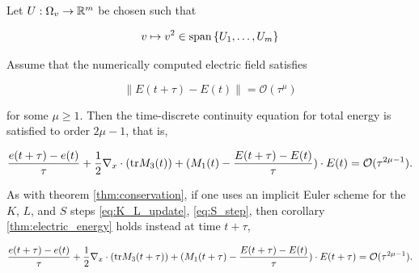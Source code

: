 \begin{corollary}\label{thm:electric_energy}
    Let $U : \Omega_v \to \mathbb{R}^m$ be chosen such that 

    \begin{equation}
        v \mapsto v^2 \in \text{span} \left\{ U_1, \ldots, U_m \right\} 
    \end{equation}

    Assume that the numerically computed electric field satisfies 

    \begin{equation}
        \left\| E(t + \tau) - E(t) \right\| = \mathcal{O} (\tau^\mu)
    \end{equation}
    
    for some $\mu \geq 1$. Then the time-discrete 
    continuity equation for total energy is satisfied to order $2\mu - 1$, that is,

    \begin{equation}
        \frac{e(t + \tau) - e(t)}{\tau}
        + \frac{1}{2} \nabla_x \cdot (\text{tr} M_3 (t)) 
        + (M_1 (t) - \frac{E(t + \tau) - E(t)}{\tau}) \cdot E (t)
        = \mathcal{O} (\tau^{2\mu - 1}) . 
    \end{equation}

\end{corollary}

\begin{remark}
    As with theorem \ref{thm:conservation}, if one uses an implicit Euler scheme for 
    the $K$, $L$, and $S$ steps \ref{eq:K_L_update}, \ref{eq:S_step}, then corollary 
    \ref{thm:electric_energy} holds instead at time $t + \tau$, 

    \begin{equation}
        \frac{e(t + \tau) - e(t)}{\tau}
        + \frac{1}{2} \nabla_x \cdot (\text{tr} M_3 (t + \tau)) 
        + (M_1 (t + \tau) - \frac{E(t + \tau) - E(t)}{\tau}) \cdot E (t + \tau)
        = \mathcal{O} (\tau^{2\mu - 1}) . 
    \end{equation}
\end{remark}

